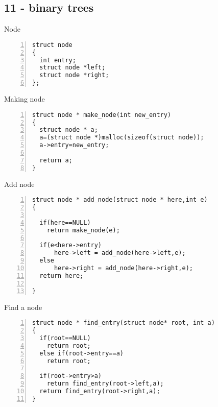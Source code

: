 \documentclass{beamer}
\begin{document}
\subsection*{11 - binary trees}
\begin{frame}[fragile]{Node}
\begin{lstlisting}[numbers=left]
struct node
{
  int entry;
  struct node *left;
  struct node *right;
};
\end{lstlisting}
\end{frame}
\begin{frame}[fragile]{Making node}
\begin{lstlisting}[numbers=left]
struct node * make_node(int new_entry)
{
  struct node * a;
  a=(struct node *)malloc(sizeof(struct node));
  a->entry=new_entry;

  return a;
}
\end{lstlisting}
\end{frame}
\begin{frame}[fragile]{Add node}
\begin{lstlisting}[numbers=left]
struct node * add_node(struct node * here,int e)
{

  if(here==NULL)
    return make_node(e);

  if(e<here->entry)
      here->left = add_node(here->left,e);
  else
      here->right = add_node(here->right,e);
  return here;

}
\end{lstlisting}
\end{frame}
\begin{frame}[fragile]{Find a node}
\begin{lstlisting}[numbers=left]
struct node * find_entry(struct node* root, int a)
{
  if(root==NULL)
    return root;
  else if(root->entry==a)
    return root;

  if(root->entry>a)
    return find_entry(root->left,a);
  return find_entry(root->right,a);
}
\end{lstlisting}
\end{frame}
\end{document}
